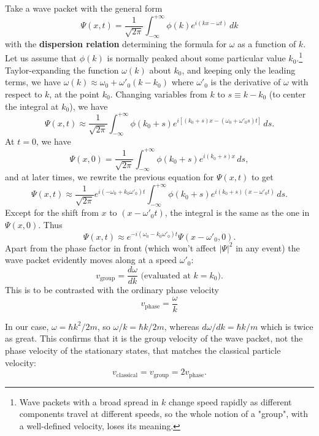 \documentclass{article}
\begin{document}
Take a wave packet with the general form \[
  \Psi(x, t) = \frac{1}{\sqrt{2\pi}}\int_{-\infty}^{+\infty}
    \phi(k)e^{i(kx - \omega t)}
  \,dk
\] with the \textbf{dispersion relation} determining the formula for $\omega$
as a function of $k$. Let us assume that $\phi(k)$ is normally peaked about
some particular value $k_0$.\footnote{Wave packets with a broad spread in $k$
change speed rapidly as different components travel at different speeds, so the
whole notion of a "group", with a well-defined velocity, loses its meaning.}
Taylor-expanding the function $\omega(k)$ about $k_0$, and keeping only the
leading terms, we have $\omega(k) \approx \omega_0 + \omega'_0(k - k_0)$ where
$\omega'_0$ is the derivative of $\omega$ with respect to $k$, at the point
$k_0$. Changing variables from $k$ to $s \equiv k - k_0$ (to center the
integral at $k_0$), we have \[
  \Psi(x, t) \approx \frac{1}{\sqrt{2\pi}}\int_{-\infty}^{+\infty}
    \phi(k_0 + s)e^{i[(k_0 + s)x - (\omega_0 + \omega'_0s)t]}
  \,ds.
\] At $t = 0$, we have \[
  \Psi(x, 0) = \frac{1}{\sqrt{2\pi}}\int_{-\infty}^{+\infty}
    \phi(k_0 + s)e^{i(k_0 + s)x}
  \,ds,
\] and at later times, we rewrite the previous equation for $\Psi(x, t)$ to get
\[
  \Psi(x, t)
  \approx \frac{1}{\sqrt{2\pi}}e^{i(-\omega_0 + k_0\omega'_0)t}
  \int_{-\infty}^{+\infty}
    \phi(k_0 + s)e^{i(k_0 + s)(x - \omega'_0t)}
  \,ds.
\] Except for the shift from $x$ to $(x - \omega'_0t)$, the integral is the
same as the one in $\Psi(x, 0)$. Thus
\begin{equation} \label{eq:wave-pac-psi}
  \boxed{
    \Psi(x, t) \approx e^{-i(\omega_0 - k_0\omega'_0)t}\Psi(x - \omega'_0, 0).
  }
\end{equation}
Apart from the phase factor in front (which won't affect $|\Psi|^2$ in any
event) the wave packet evidently moves along at a speed $\omega'_0$:
\begin{equation} \label{eq:wave-pac-vel-grp}
  v_{\text{group}} = \frac{d\omega}{dk}
  \text{ (evaluated at $k = k_0$)}.
\end{equation}
This is to be contrasted with the ordinary phase velocity
\begin{equation} \label{eq:wave-pac-vel-pha}
  v_{\text{phase}} = \frac{\omega}{k}
\end{equation}

In our case, $\omega = \hbar k^2/2m$, so $\omega/k = \hbar k/2m$, whereas
$d\omega/dk = \hbar k/m$ which is twice as great. This confirms that it is the
group velocity of the wave packet, not the phase velocity of the stationary
states, that matches the classical particle velocity:
\begin{equation} \label{eq:wave-pac-vel}
  v_{\text{classical}} = v_{\text{group}} = 2v_{\text{phase}}.
\end{equation}
\end{document}
